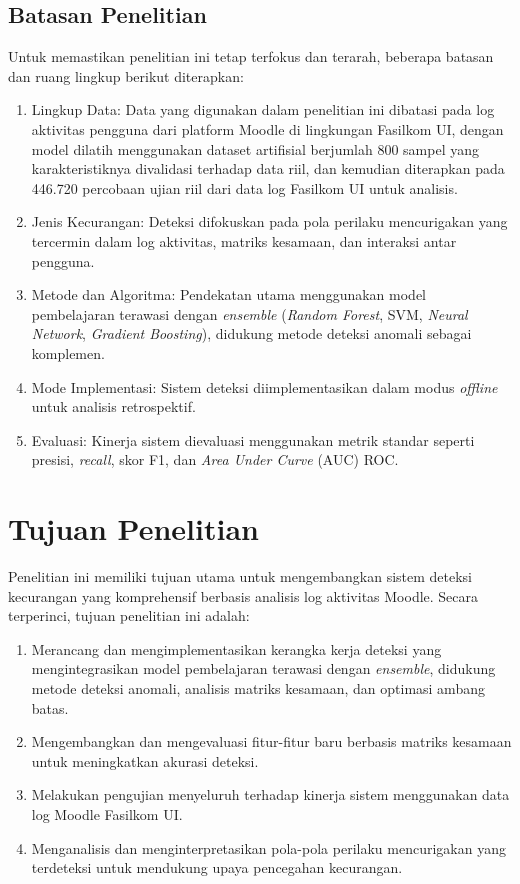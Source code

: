\subsection{Batasan Penelitian}
\label{sec:batasanMasalah}
Untuk memastikan penelitian ini tetap terfokus dan terarah, beberapa batasan dan ruang lingkup berikut diterapkan:
\begin{enumerate}
    \item Lingkup Data: Data yang digunakan dalam penelitian ini dibatasi pada log aktivitas pengguna dari platform Moodle di lingkungan Fasilkom UI, dengan model dilatih menggunakan dataset artifisial berjumlah 800 sampel yang karakteristiknya divalidasi terhadap data riil, dan kemudian diterapkan pada 446.720 percobaan ujian riil dari data log Fasilkom UI untuk analisis.
    \item Jenis Kecurangan: Deteksi difokuskan pada pola perilaku mencurigakan yang tercermin dalam log aktivitas, matriks kesamaan, dan interaksi antar pengguna.
    \item Metode dan Algoritma: Pendekatan utama menggunakan model pembelajaran terawasi dengan \textit{ensemble} (\textit{Random Forest}, SVM, \textit{Neural Network}, \textit{Gradient Boosting}), didukung metode deteksi anomali sebagai komplemen.
    \item Mode Implementasi: Sistem deteksi diimplementasikan dalam modus \textit{offline} untuk analisis retrospektif.
    \item Evaluasi: Kinerja sistem dievaluasi menggunakan metrik standar seperti presisi, \textit{recall}, skor F1, dan \textit{Area Under Curve} (AUC) ROC.
\end{enumerate}

\section{Tujuan Penelitian}
\label{sec:tujuan}
Penelitian ini memiliki tujuan utama untuk mengembangkan sistem deteksi kecurangan yang komprehensif berbasis analisis log aktivitas Moodle. Secara terperinci, tujuan penelitian ini adalah:
\begin{enumerate}
    \item Merancang dan mengimplementasikan kerangka kerja deteksi yang mengintegrasikan model pembelajaran terawasi dengan \textit{ensemble}, didukung metode deteksi anomali, analisis matriks kesamaan, dan optimasi ambang batas.
    \item Mengembangkan dan mengevaluasi fitur-fitur baru berbasis matriks kesamaan untuk meningkatkan akurasi deteksi.
    \item Melakukan pengujian menyeluruh terhadap kinerja sistem menggunakan data log Moodle Fasilkom UI.
    \item Menganalisis dan menginterpretasikan pola-pola perilaku mencurigakan yang terdeteksi untuk mendukung upaya pencegahan kecurangan.
\end{enumerate}

